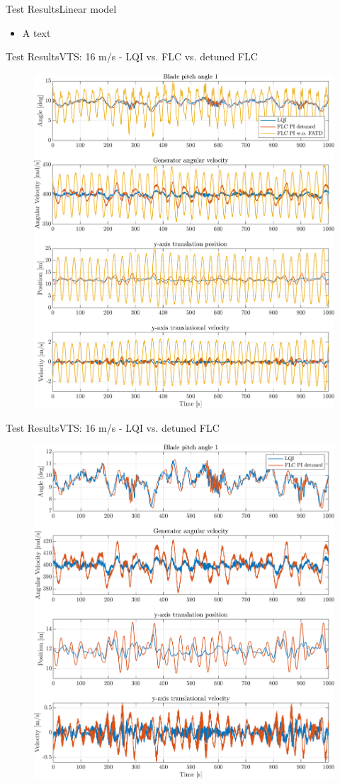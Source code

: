 \begin{frame}{Test Results}{Linear model}
	\begin{itemize}
		\item A text
	\end{itemize}
\end{frame}


\begin{frame}{Test Results}{VTS: 16 m/s - LQI vs. FLC vs. detuned FLC}
	\begin{figure}[h]
		\centering
		\includegraphics[width=0.7\linewidth]{../Graphics/TestResults/VTSplotting/3_th_w_py_vy.png}
		\label{fig:vts_3_th_w_py_vy}
	\end{figure}
\end{frame}



\begin{frame}{Test Results}{VTS: 16 m/s - LQI vs. detuned FLC}
	\begin{figure}[h]
		\centering
		\includegraphics[width=0.7\linewidth]{../Graphics/TestResults/VTSplotting/10_th_w_py_vy.png}
		\label{fig:vts_10_th_w_py_vy}
	\end{figure}
\end{frame}


